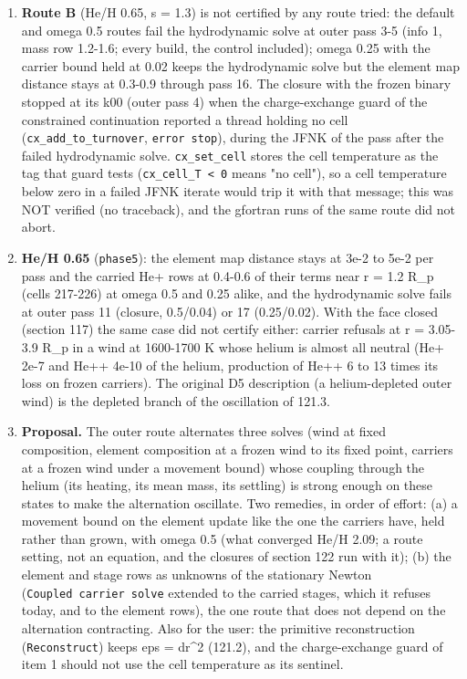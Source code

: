 \documentclass[english,a4paper]{my_memo}
\providecommand{\tightlist}{\setlength{\itemsep}{0pt}\setlength{\parskip}{0pt}}
\begin{document}
\begin{enumerate}
\def\labelenumi{\arabic{enumi}.}
\tightlist
\item
  \textbf{Route B} (He/H 0.65, s = 1.3) is not certified by any route tried:
  the default and omega 0.5 routes fail the hydrodynamic solve at outer
  pass 3-5 (info 1, mass row 1.2-1.6; every build, the control included);
  omega 0.25 with the carrier bound held at 0.02 keeps the hydrodynamic
  solve but the element map distance stays at 0.3-0.9 through pass 16. The
  closure with the frozen binary stopped at its k00 (outer pass 4) when the
  charge-exchange guard of the constrained continuation reported a thread
  holding no cell (\texttt{cx\_add\_to\_turnover}, \texttt{error\ stop}), during the JFNK of
  the pass after the failed hydrodynamic solve. \texttt{cx\_set\_cell} stores the
  cell temperature as the tag that guard tests (\texttt{cx\_cell\_T\ \textless{}\ 0} means "no
  cell"), so a cell temperature below zero in a failed JFNK iterate would
  trip it with that message; this was NOT verified (no traceback), and the
  gfortran runs of the same route did not abort.
\item
  \textbf{He/H 0.65} (\texttt{phase5}): the element map distance stays at 3e-2 to
  5e-2 per pass and the carried He+ rows at 0.4-0.6 of their terms near
  r = 1.2 R\_p (cells 217-226) at omega 0.5 and 0.25 alike, and the
  hydrodynamic solve fails at outer pass 11 (closure, 0.5/0.04) or 17
  (0.25/0.02). With the face closed (section 117) the same case did not
  certify either: carrier refusals at r = 3.05-3.9 R\_p in a wind at
  1600-1700 K whose helium is almost all neutral (He+ 2e-7 and He++ 4e-10
  of the helium, production of He++ 6 to 13 times its loss on frozen
  carriers). The original D5 description (a helium-depleted outer wind) is
  the depleted branch of the oscillation of 121.3.
\item
  \textbf{Proposal.} The outer route alternates three solves (wind at fixed
  composition, element composition at a frozen wind to its fixed point,
  carriers at a frozen wind under a movement bound) whose coupling through
  the helium (its heating, its mean mass, its settling) is strong enough
  on these states to make the alternation oscillate. Two remedies, in
  order of effort: (a) a movement bound on the element update like the one
  the carriers have, held rather than grown, with omega 0.5 (what converged
  He/H 2.09; a route setting, not an equation, and the closures of section
  122 run with it); (b) the element and stage rows as unknowns of the
  stationary Newton (\texttt{Coupled\ carrier\ solve} extended to the carried
  stages, which it refuses today, and to the element rows), the one route
  that does not depend on the alternation contracting. Also for the user:
  the primitive reconstruction (\texttt{Reconstruct}) keeps eps = dr\^{}2 (121.2),
  and the charge-exchange guard of item 1 should not use the cell
  temperature as its sentinel.
\end{enumerate}
\end{document}

